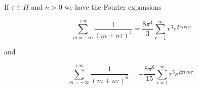 If $\tau \in H$ and $n > 0$ we have the Fourier expansions

$$\sum_{m=-\infty}^{+\infty} \frac{1}{(m+n\tau)^4} = \frac{8\pi^4}{3} \sum_{r=1}^{\infty} r^3 e^{2\pi i r n\tau}$$

and

$$\sum_{m=-\infty}^{+\infty} \frac{1}{(m+n\tau)^6} = -\frac{8\pi^6}{15} \sum_{r=1}^{\infty} r^5 e^{2\pi i r n\tau}.$$
